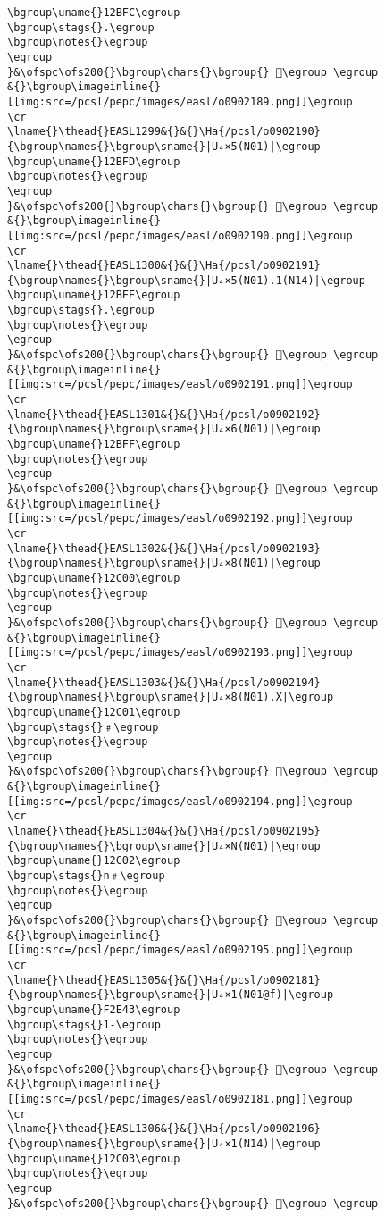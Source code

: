 \begin{verbatim}
\bgroup\uname{}12BFC\egroup
\bgroup\stags{}.\egroup
\bgroup\notes{}\egroup
\egroup
}&\ofspc\ofs200{}\bgroup\chars{}\bgroup{} 𒯼\egroup \egroup
&{}\bgroup\imageinline{}[[img:src=/pcsl/pepc/images/easl/o0902189.png]]\egroup
\cr
\lname{}\thead{}EASL1299&{}&{}\Ha{/pcsl/o0902190}{\bgroup\names{}\bgroup\sname{}|U₄×5(N01)|\egroup
\bgroup\uname{}12BFD\egroup
\bgroup\notes{}\egroup
\egroup
}&\ofspc\ofs200{}\bgroup\chars{}\bgroup{} 𒯽\egroup \egroup
&{}\bgroup\imageinline{}[[img:src=/pcsl/pepc/images/easl/o0902190.png]]\egroup
\cr
\lname{}\thead{}EASL1300&{}&{}\Ha{/pcsl/o0902191}{\bgroup\names{}\bgroup\sname{}|U₄×5(N01).1(N14)|\egroup
\bgroup\uname{}12BFE\egroup
\bgroup\stags{}.\egroup
\bgroup\notes{}\egroup
\egroup
}&\ofspc\ofs200{}\bgroup\chars{}\bgroup{} 𒯾\egroup \egroup
&{}\bgroup\imageinline{}[[img:src=/pcsl/pepc/images/easl/o0902191.png]]\egroup
\cr
\lname{}\thead{}EASL1301&{}&{}\Ha{/pcsl/o0902192}{\bgroup\names{}\bgroup\sname{}|U₄×6(N01)|\egroup
\bgroup\uname{}12BFF\egroup
\bgroup\notes{}\egroup
\egroup
}&\ofspc\ofs200{}\bgroup\chars{}\bgroup{} 𒯿\egroup \egroup
&{}\bgroup\imageinline{}[[img:src=/pcsl/pepc/images/easl/o0902192.png]]\egroup
\cr
\lname{}\thead{}EASL1302&{}&{}\Ha{/pcsl/o0902193}{\bgroup\names{}\bgroup\sname{}|U₄×8(N01)|\egroup
\bgroup\uname{}12C00\egroup
\bgroup\notes{}\egroup
\egroup
}&\ofspc\ofs200{}\bgroup\chars{}\bgroup{} 𒰀\egroup \egroup
&{}\bgroup\imageinline{}[[img:src=/pcsl/pepc/images/easl/o0902193.png]]\egroup
\cr
\lname{}\thead{}EASL1303&{}&{}\Ha{/pcsl/o0902194}{\bgroup\names{}\bgroup\sname{}|U₄×8(N01).X|\egroup
\bgroup\uname{}12C01\egroup
\bgroup\stags{}﹟\egroup
\bgroup\notes{}\egroup
\egroup
}&\ofspc\ofs200{}\bgroup\chars{}\bgroup{} 𒰁\egroup \egroup
&{}\bgroup\imageinline{}[[img:src=/pcsl/pepc/images/easl/o0902194.png]]\egroup
\cr
\lname{}\thead{}EASL1304&{}&{}\Ha{/pcsl/o0902195}{\bgroup\names{}\bgroup\sname{}|U₄×N(N01)|\egroup
\bgroup\uname{}12C02\egroup
\bgroup\stags{}n﹟\egroup
\bgroup\notes{}\egroup
\egroup
}&\ofspc\ofs200{}\bgroup\chars{}\bgroup{} 𒰂\egroup \egroup
&{}\bgroup\imageinline{}[[img:src=/pcsl/pepc/images/easl/o0902195.png]]\egroup
\cr
\lname{}\thead{}EASL1305&{}&{}\Ha{/pcsl/o0902181}{\bgroup\names{}\bgroup\sname{}|U₄×1(N01@f)|\egroup
\bgroup\uname{}F2E43\egroup
\bgroup\stags{}1-\egroup
\bgroup\notes{}\egroup
\egroup
}&\ofspc\ofs200{}\bgroup\chars{}\bgroup{} 󲹃\egroup \egroup
&{}\bgroup\imageinline{}[[img:src=/pcsl/pepc/images/easl/o0902181.png]]\egroup
\cr
\lname{}\thead{}EASL1306&{}&{}\Ha{/pcsl/o0902196}{\bgroup\names{}\bgroup\sname{}|U₄×1(N14)|\egroup
\bgroup\uname{}12C03\egroup
\bgroup\notes{}\egroup
\egroup
}&\ofspc\ofs200{}\bgroup\chars{}\bgroup{} 𒰃\egroup \egroup

\end{verbatim}
